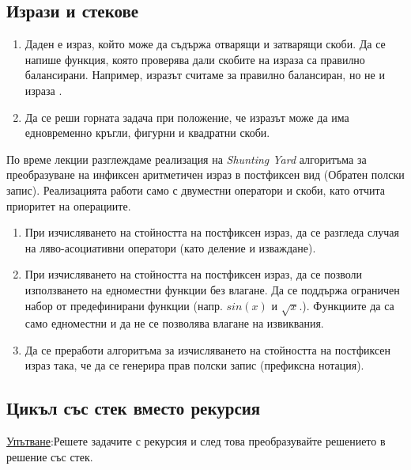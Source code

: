\subsection {Изрази и стекове}

\begin{enumerate}[resume]
  \item Даден е израз, който може да съдържа отварящи и затварящи скоби.  Да се напише функция, която проверява дали скобите на израза са  правилно балансирани. Например, изразът  считаме за правилно балансиран, но не и израза .
  \item Да се реши горната задача при положение, че изразът може да има едновременно кръгли, фигурни и квадратни скоби.

\end{enumerate}


\begin{mdframed}[hidealllines=true,backgroundcolor=gray!20]
  По време лекции разглеждаме реализация на \emph{Shunting Yard} алгоритъма за преобразуване на инфиксен аритметичен израз в постфиксен вид (Обратен полски запис). Реализацията работи само с двуместни оператори и скоби, като отчита приоритет на операциите.
\end{mdframed}

\begin{enumerate}[resume]
  \item При изчисляването на стойността на постфиксен израз, да се разгледа случая на ляво-асоциативни оператори (като деление и изваждане).
  \item При изчисляването на стойността на постфиксен израз, да се позволи използването на едноместни функции без влагане. Да се поддържа ограничен набор от предефинирани функции (напр. $sin(x)$ и $\sqrt{x}$.). Функциите да са само едноместни и да не се позволява влагане на извиквания.
  \item Да се преработи алгоритъма за изчисляването на стойността на постфиксен израз така, че да се генерира прав полски запис (префиксна нотация).
\end{enumerate}

\subsection {Цикъл със стек вместо рекурсия}

\underline{Упътване}:Решете задачите с рекурсия и след това преобразувайте решението в решение със стек.



